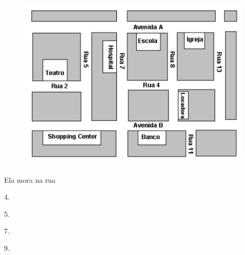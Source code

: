 \begin{figure}[H]
\centering\includegraphics[width=4.76042in,height=3.42708in]{./imgSAEB_6_MAT/media/image75.png}
\end{figure}

Ela mora na rua

\begin{multicols}{2}
\begin{escolha}
\item 4.
\item 5.
\item 7.
\item 9.
\end{escolha}
\end{multicols}



